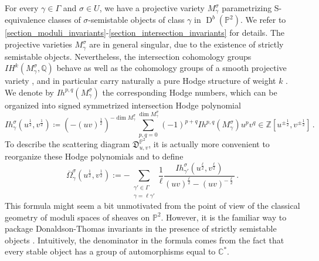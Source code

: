 \documentclass[12pt, a4paper]{amsart}
\newcommand\C{\mathbb C}
\newcommand\PP{\mathbb P}
\newcommand\Q{\mathbb Q}
\newcommand\Z{\mathbb Z}
\newcommand\fD{\mathfrak D}
\newcommand\D{\operatorname{D}}
\begin{document}
For every $\gamma \in \Gamma$ and $\sigma \in U$, we have a projective variety $M_\gamma^\sigma$ parametrizing S-equivalence classes of $\sigma$-semistable objects of class $\gamma$ in $\D^b(\PP^2)$. We refer to \cref{section_moduli_invariants}-\cref{section_intersection_invariants} for details. The projective varieties 
$M_\gamma^\sigma$ are in general singular, due to the existence of strictly semistable objects. Nevertheless, the intersection cohomology groups $IH^{k}(M_\gamma^\sigma, \Q)$ behave as well as the cohomology groups of a smooth projective variety \cite{MR572580,MR696691,MR751966}, and in particular  
carry naturally a pure Hodge structure of weight $k$ \cite{MR1047415}. 
We denote by $Ih^{p,q}(M_\gamma^\sigma)$ the corresponding Hodge numbers, which can be organized into signed symmetrized intersection  
Hodge polynomial 
\[Ih_\gamma^\sigma(u^{\frac{1}{2}},v^{\frac{1}{2}}) \coloneq 
(-(uv)^{\frac{1}{2}})^{- \dim M_\gamma^\sigma}
\sum_{p,q=0}^{\dim M_\gamma^\sigma}
(-1)^{p+q}
Ih^{p,q}(M_\gamma^\sigma) u^p v^q \in \Z[u^{\pm
\frac{1}{2}},v^{\pm \frac{1}{2}}] \,.\]
To describe the scattering diagram $\fD^{\PP^2}_{u,v}$, it is actually more convenient to reorganize these Hodge polynomials and to define 
\[ \overline{\Omega}_\gamma^\sigma(u^{\frac{1}{2}}, v^{\frac{1}{2}}) :=-\sum_{\substack{\gamma' \in \Gamma\\ \gamma=\ell \gamma'}}
\frac{1}{\ell}
\frac{Ih_{\gamma'}^\sigma(u^{\frac{\ell}{2}}, v^{\frac{\ell}{2}})}{
(uv)^{\frac{\ell}{2}}-(uv)^{-\frac{\ell}{2}}}\,. \]
This formula might seem a bit unmotivated from the point of view of the classical geometry of moduli spaces of sheaves on $\PP^2$. However, it is the familiar way to package Donaldson-Thomas invariants in the presence of strictly semistable objects \cite{kontsevich2008stability, MR2951762}. Intuitively, the denominator in the formula comes from the fact that every stable object has a group of automorphisms equal to $\C^{*}$.
\end{document}
